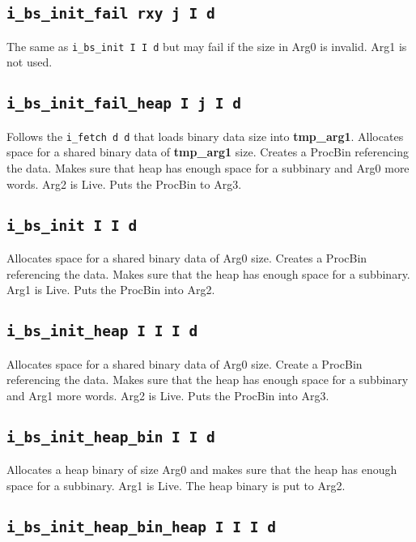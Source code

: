 \documentclass{article}
\newcommand{\tmpa}{\textbf{tmp\_arg1}}
\newcommand{\iop}[1]{\texttt{#1}}
\begin{document}
\subsection*{\iop{i\_bs\_init\_fail rxy j I d}}

The same as \iop{i\_bs\_init I I d} but may fail if the size in Arg0 is invalid.
Arg1 is not used.

\subsection*{\iop{i\_bs\_init\_fail\_heap I j I d}}

Follows the \iop{i\_fetch d d} that loads binary data size into \tmpa{}.
Allocates space for a shared binary data of \tmpa{} size. Creates a ProcBin
referencing the data. Makes sure that heap has enough space for a subbinary and
Arg0 more words. Arg2 is Live. Puts the ProcBin to Arg3.

\subsection*{\iop{i\_bs\_init I I d}}

Allocates space for a shared binary data of Arg0 size. Creates a ProcBin
referencing the data. Makes sure that the heap has enough space for a subbinary.
Arg1 is Live. Puts the ProcBin into Arg2.

\subsection*{\iop{i\_bs\_init\_heap I I I d}}

Allocates space for a shared binary data of Arg0 size. Create a ProcBin
referencing the data. Makes sure that the heap has enough space for a subbinary
and Arg1 more words. Arg2 is Live. Puts the ProcBin into Arg3.

\subsection*{\iop{i\_bs\_init\_heap\_bin I I d}}

Allocates a heap binary of size Arg0 and makes sure that the heap has enough
space for a subbinary. Arg1 is Live. The heap binary is put to Arg2.

\subsection*{\iop{i\_bs\_init\_heap\_bin\_heap I I I d}}
\end{document}
